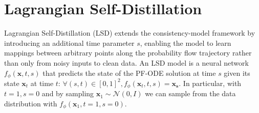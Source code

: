 \appendix




\section{Lagrangian Self-Distillation}
\label{sec:LSD}
Lagrangian Self-Distillation (LSD) \citep{lsd} extends the consistency-model framework by introducing an additional time parameter $s$, enabling the model to learn mappings between arbitrary points along the probability flow trajectory rather than only from noisy inputs to clean data. An LSD model is a neural network $f_\phi(\mathbf{x}, t, s)$ that predicts the state of the PF-ODE solution at time $s$ given its state $\mathbf{x}_t$ at time $t$: $\forall (s,t) \in[0,1]^2, f_\phi(\mathbf{x}_t, t, s)=\mathbf{x_s}$.
In particular, with $t=1, s=0$ and by sampling $\mathbf{x}_1 \sim \mathcal{N}(0, I)$ we can sample from the data distribution with $f_\phi(\mathbf{x}_1, t=1, s=0)$.

